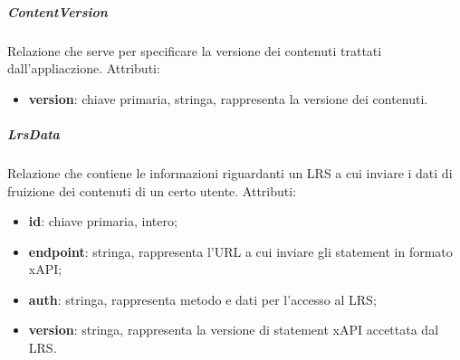\documentclass[../Tesi.tex]{subfiles}
\begin{document}
				\subparagraph*{ContentVersion}
				Relazione che serve per specificare la versione dei contenuti trattati dall'appliaczione. Attributi:
				\begin{itemize}
					\item \textbf{version}: chiave primaria, stringa, rappresenta la versione dei contenuti.
				\end{itemize}

				\subparagraph*{LrsData}
				Relazione che contiene le informazioni riguardanti un LRS a cui inviare i dati di fruizione dei contenuti di un certo utente. Attributi:
				\begin{itemize}
					\item \textbf{id}: chiave primaria, intero;
					\item \textbf{endpoint}: stringa, rappresenta l'URL a cui inviare gli statement in formato xAPI;
					\item \textbf{auth}: stringa, rappresenta metodo e dati per l'accesso al LRS;
					\item \textbf{version}: stringa, rappresenta la versione di statement xAPI accettata dal LRS.
				\end{itemize}
\end{document}
